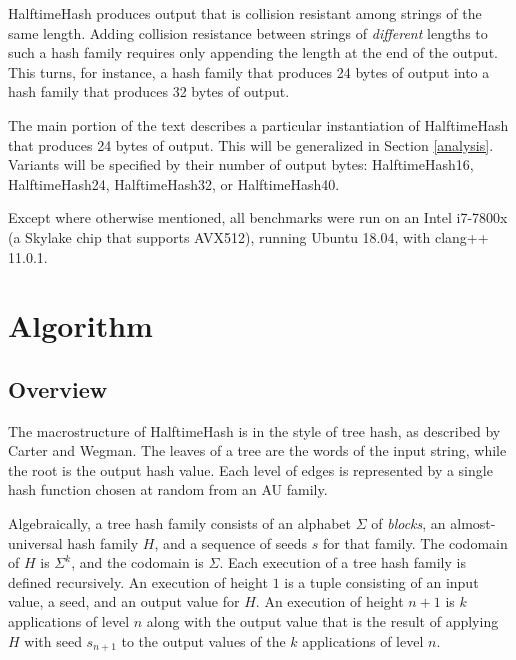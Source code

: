 \documentclass[sigconf, nonacm]{acmart}
\begin{document}
HalftimeHash produces output that is collision resistant among strings of the same length.
Adding collision resistance between strings of {\em different} lengths to such a hash family requires only appending the length at the end of the output.
This turns, for instance, a hash family that produces 24 bytes of output into a hash family that produces 32 bytes of output.

The main portion of the text describes a particular instantiation of HalftimeHash that produces 24 bytes of output.
This will be generalized in Section \ref{analysis}.
Variants will be specified by their number of output bytes: HalftimeHash16, HalftimeHash24, HalftimeHash32, or HalftimeHash40.

Except where otherwise mentioned, all benchmarks were run on an Intel i7-7800x (a Skylake chip that supports AVX512), running Ubuntu 18.04, with clang++ 11.0.1.



\section{Algorithm}
\label{algo}

\subsection{Overview}

The macrostructure of HalftimeHash is in the style of tree hash, as described by Carter and Wegman. \cite{carter-wegman-79}
The leaves of a tree are the words of the input string, while the root is the output hash value.
Each level of edges is represented by a single hash function chosen at random from an AU family.

Algebraically, a tree hash family consists of an alphabet $\Sigma$ of {\em blocks}, an almost-universal hash family $H$, and a sequence of seeds $s$ for that family.
The codomain of $H$ is $\Sigma^k$, and the codomain is $\Sigma$.
Each execution of a tree hash family is defined recursively.
An execution of height $1$ is a tuple consisting of an input value, a seed, and an output value for $H$.
An execution of height $n+1$ is $k$ applications of level $n$ along with the output value that is the result of applying $H$ with seed $s_{n+1}$ to the output values of the $k$ applications of level $n$.
\end{document}
